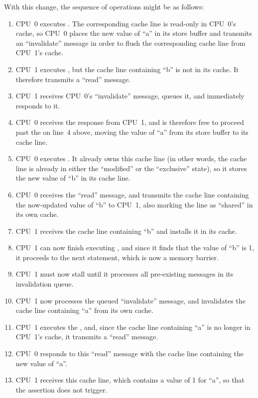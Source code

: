 With this change, the sequence of operations might be as follows:
\begin{enumerate}
\item	CPU~0 executes .  The corresponding
	cache line is read-only in
	CPU~0's cache, so CPU~0 places the new value of ``a'' in its
	store buffer and transmits an ``invalidate'' message in order
	to flush the corresponding cache line from CPU~1's cache.
\item	CPU~1 executes , but the cache line
	containing ``b'' is not in its cache.
	It therefore transmits a ``read'' message.
\item	CPU~1 receives CPU~0's ``invalidate'' message, queues it, and
	immediately responds to it.
\item	CPU~0 receives the response from CPU~1, and is therefore free
	to proceed past the  on line~4 above, moving
	the value of ``a'' from its store buffer to its cache line.
\item	CPU~0 executes .
	It already owns this cache line (in other words, the cache line
	is already in either the ``modified'' or the ``exclusive'' state),
	so it stores the new value of ``b'' in its cache line.
\item	CPU~0 receives the ``read'' message, and transmits the
	cache line containing the now-updated value of ``b''
	to CPU~1, also marking the line as ``shared'' in its own cache.
\item	CPU~1 receives the cache line containing ``b'' and installs
	it in its cache.
\item	CPU~1 can now finish executing ,
	and since it finds that the value of ``b'' is 1, it proceeds
	to the next statement, which is now a memory barrier.
\item	CPU~1 must now stall until it processes all pre-existing
	messages in its invalidation queue.
\item	CPU~1 now processes the queued
	``invalidate'' message, and
	invalidates the cache line containing ``a'' from its own cache.
\item	CPU~1 executes the , and, since the
	cache line containing ``a'' is no longer in CPU~1's cache,
	it transmits a ``read'' message.
\item	CPU~0 responds to this ``read'' message with the cache line
	containing the new value of ``a''.
\item	CPU~1 receives this cache line, which contains a value of 1 for
	``a'', so that the assertion does not trigger.
\end{enumerate}

